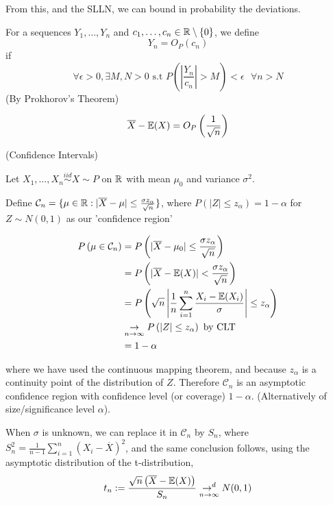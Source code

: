 \documentclass[a4paper]{article}
\begin{document}
From this, and the SLLN, we can bound in probability the deviations.

\begin{defn}
	For a sequences $Y_1, \ldots, Y_n$ and $c_1, \ldots, c_n \in \mathbb{R}\setminus\{0\}$, we define 
	 \[
		 Y_n = O_{P}(c_n)
	\]
	if
	\[
		\forall \epsilon > 0, \exists M,N > 0 \text{ s.t } P\left( \left| \frac{Y_n}{c_n} \right| > M \right) < \epsilon \text{  } \forall n > N
	\] (By Prokhorov's Theorem) 
\end{defn}

\begin{corol}
	\[
		\overline{X} - \mathbb{E}(X) = O_P \left(\frac{1}{\sqrt{n} }\right)
	\] 
\end{corol}

\begin{eg} (Confidence Intervals)

	Let $X_1, \ldots, X_n \stackrel{iid}{\sim} X \sim P$ on $\mathbb{R}$ with mean  $\mu_{0}$ and variance $\sigma^2$.

	Define  $\mathcal{C}_n = \{\mu \in \mathbb{R} : |\overline{X} - \mu| \le \frac{\sigma z_{\alpha}}{\sqrt{n} }\} $, where $P\left( |Z| \le z_{\alpha} \right) = 1 - \alpha $ for $Z\sim N(0,1)$ as our 'confidence region'

	\begin{align*}
		P\left( \mu \in \mathcal{C}_n \right) &= P\left( |\overline{X} - \mu_0| \le \frac{\sigma z_{\alpha}}{\sqrt{n} }  \right) \\
		&= P\left( |\overline{X} - \mathbb{E}(X)| < \frac{\sigma z_{\alpha}}{\sqrt{n} } \right) \\
		&= P\left( \sqrt{n} \left| \frac{1}{n} \sum_{i=1}^{n} \frac{X_i - \mathbb{E}(X_i)}{\sigma} \right| \le z_{\alpha} \right) \\
		&\underset{n \to \infty}{\to } P\left( |Z| \le z_{\alpha} \right) \text{ by CLT} \\
		&= 1- \alpha
	\end{align*}

	where we have used the continuous mapping theorem, and because $z_{\alpha}$ is a continuity point of the distribution of $Z$. Therefore $\mathcal{C}_n$ is an asymptotic confidence region with confidence level (or coverage) $1-\alpha$. (Alternatively of size/significance level  $\alpha$).

	When  $\sigma$ is unknown, we can replace it in $\mathcal{C}_n$ by $S_n$, where  $S_{n}^2 = \frac{1}{n-1} \sum_{i=1}^{n}(X_i - \overline{X})^2$, and the same conclusion follows, using the asymptotic distribution of the t-distribution,
	\[
		t_n := \frac{\sqrt{n}\left (\overline{X} - \mathbb{E}(X)\right)}{S_n} \underset{n \to \infty}{\to ^{d}} N(0,1)
	\] 
\end{eg}
\end{document}
